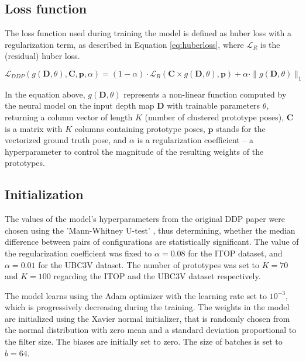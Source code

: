 \subsection{Loss function}

The loss function used during training the model is defined as huber loss with a regularization term, as described in Equation \ref{eq:huberloss}, where $\mathcal{L}_R$ is the (residual) huber loss.\par

\begin{equation}
\mathcal{L}_{DDP}(g(\mathbf{D}, \theta), \mathbf{C}, \mathbf{p}, \alpha) = (1 - \alpha) \cdot \mathcal{L}_R(\mathbf{C} \times g(\mathbf{D}, \theta), \mathbf{p}) + \alpha \cdot \|g(\mathbf{D}, \theta)\|_1 \label{eq:huberloss}
\end{equation} 

\noindent In the equation above, $g(\mathbf{D}, \theta)$ represents a non-linear function computed by the neural model on the input depth map $\mathbf{D}$ with trainable parameters $\theta$, returning a column vector of length $K$ (number of clustered prototype poses), $\mathbf{C}$ is a matrix with $K$ columns containing prototype poses, $\mathbf{p}$ stands for the vectorized ground truth pose,  and $\alpha$ is a regularization coefficient  – a hyperparameter to control the magnitude of the resulting weights of the prototypes.

\subsection{Initialization}

The values of the model's hyperparameters from the original DDP paper were chosen using the 'Mann-Whitney U-test' \cite{mann1947}, thus determining, whether the median difference between pairs of configurations are statistically significant. The value of the regularization coefficient was fixed to $\alpha = 0.08$ for the ITOP dataset, and $\alpha = 0.01$ for the UBC3V dataset. The number of prototypes was set to $K=70$ and $K=100$ regarding the ITOP and the UBC3V dataset respectively.\par
\vspace{5mm}
\noindent
The model learns using the Adam optimizer with the learning rate set to $10^{-3}$, which is progressively decreasing during the training.  The weights in the model are initialized using the Xavier normal initializer, that is randomly chosen from the normal distribution with zero mean and a standard deviation proportional to the filter size. The biases are initially set to zero. The size of batches is set to $b=64$.

